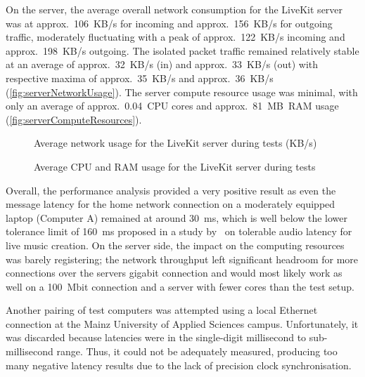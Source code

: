 On the server, the average overall network consumption for the LiveKit server was at approx.~106~\ac{KB/s} for incoming and approx.~156~KB/s for outgoing traffic, moderately fluctuating with a peak of approx.~122~\ac{KB/s} incoming and approx.~198~\ac{KB/s} outgoing.
The isolated packet traffic remained relatively stable at an average of approx.~32~\ac{KB/s} (in) and approx.~33~\ac{KB/s} (out) with respective maxima of approx.~35~\ac{KB/s} and approx.~36~\ac{KB/s} (\autoref{fig:serverNetworkUsage}).
The server compute resource usage was minimal, with only an average of approx.~0.04~\ac{CPU} cores and approx.~81~\ac{MB}~\ac{RAM} usage (\autoref{fig:serverComputeResources}).

\begin{figure*}[!ht]
\hfill

\caption[Server network usage during tests]{Average network usage for the LiveKit server during tests (\ac{KB/s})\protect}
\label{fig:serverNetworkUsage}
\end{figure*}

\begin{figure*}[!ht]
\hfill

\caption[Server compute resources usage during tests]{Average \ac{CPU} and \ac{RAM} usage for the LiveKit server during tests\protect}
\label{fig:serverComputeResources}
\end{figure*}

Overall, the performance analysis provided a very positive result as even the message latency for the home network connection on a moderately equipped laptop (Computer A) remained at around 30~\ac{ms}, which is well below the lower tolerance limit of 160~\ac{ms} proposed in a study by~\cite{audioLatency} on tolerable audio latency for live music creation.
On the server side, the impact on the computing resources was barely registering; the network throughput left significant headroom for more connections over the server\textquotesingle s gigabit connection and would most likely work as well on a 100~\ac{Mbit} connection and a server with fewer cores than the test setup.

Another pairing of test computers was attempted using a local Ethernet connection at the Mainz University of Applied Sciences campus.
Unfortunately, it was discarded because latencies were in the single-digit millisecond to sub-millisecond range.
Thus, it could not be adequately measured, producing too many negative latency results due to the lack of precision clock synchronisation.

